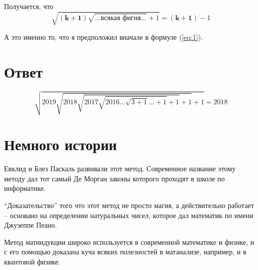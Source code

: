 \documentclass{article}
\begin{document}
Получается, что 
$$\sqrt{\boldsymbol{(k+1)}{}\sqrt{\text{...всякая фигня...}}+1}=\boldsymbol{(k+1)}-1$$

А это именно то, что я предположил вначале в формуле (\ref{eq:1}).

\section{Ответ}
$$\sqrt{2019{}\sqrt{2018\sqrt{2017\sqrt{2016\dots\sqrt{3+1}\dots+1}+1}+1}+1}=2018$$

\section{Немного истории}
Евклид и Блез Паскаль развивали этот метод. Современное название этому методу дал тот самый Де Морган законы которого проходят в школе по информатике.

``Доказательство''{ }того что этот метод не просто магия, а действительно работает -- основано на определении натуральных чисел, которое дал математик по имени Джузеппе Пеано.

Метод матиндукции широко используется в современной математике и физике, и с его помощью доказана куча всяких полезностей в матанализе, например, и в квантовой физике.
\end{document}

